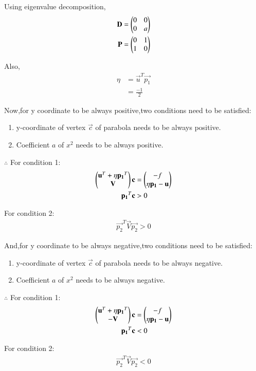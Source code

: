 \documentclass[journal,12pt,twocolumn]{IEEEtran}
\begin{document}
Using eigenvalue decomposition,
\begin{align}
    \mathbf{D} &= \begin{pmatrix}0 & 0 \\ 0 & a\end{pmatrix} \\
    \mathbf{P} &= \begin{pmatrix}0 & 1 \\ 1 & 0\end{pmatrix}
\end{align}

Also,
\begin{align}
    \eta &= \vec{u}^T\vec{p_1}
    \\
    &= \frac{-1}{2}
\end{align}

Now,for y coordinate to be always positive,two conditions need to be satisfied:
\begin{enumerate}
 \item y-coordinate of vertex $\vec{c}$ of parabola needs to be always positive.
 \item Coefficient $a$ of $x^2$ needs to be always positive.
\end{enumerate}

$\therefore$ For condition 1:
\begin{align}
    \begin{pmatrix}\mathbf{u}^T + \eta\mathbf{p_1}^T \\ \mathbf{V}\end{pmatrix}\mathbf{c} &= \begin{pmatrix}-f \\ \eta\mathbf{p_1}-\mathbf{u}\end{pmatrix} \\
    \mathbf{p_1}^T\mathbf{c} &> 0
\end{align}

For condition 2:
\begin{align}
    \vec{p_2}^T\vec{V}\vec{p_2} > 0
\end{align}

And,for y coordinate to be always negative,two conditions need to be satisfied:
\begin{enumerate}
 \item y-coordinate of vertex $\vec{c}$ of parabola needs to be always negative.
 \item Coefficient $a$ of $x^2$ needs to be always negative.
\end{enumerate}

$\therefore$ For condition 1:
\begin{align}
    \begin{pmatrix}\mathbf{u}^T + \eta\mathbf{p_1}^T \\ -\mathbf{V}\end{pmatrix}\mathbf{c} &= \begin{pmatrix}-f \\ \eta\mathbf{p_1}-\mathbf{u}\end{pmatrix} \\
    \mathbf{p_1}^T\mathbf{c} &< 0
\end{align}

For condition 2:
\begin{align}
    \vec{p_2}^T\vec{V}\vec{p_2} < 0
\end{align}
\end{document}
